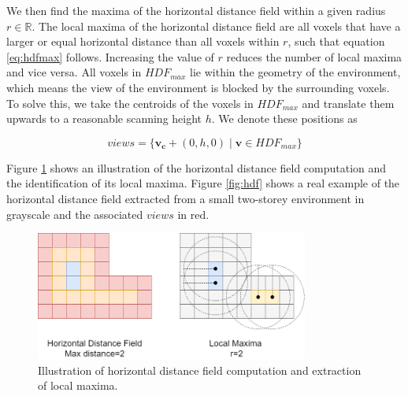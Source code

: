 We then find the maxima of the horizontal distance field within a given radius \(r \in \mathbb{R}\).  The local maxima of the horizontal distance field are all voxels that have a larger or equal horizontal distance than all voxels within \(r\), such that equation \ref{eq:hdfmax} follows. Increasing the value of \(r\) reduces the number of local maxima and vice versa. All voxels in \(HDF_{max}\) lie within the geometry of the environment, which means the view of the environment is blocked by the surrounding voxels. To solve this, we take the centroids of the voxels in \(HDF_{max}\) and translate them upwards to a reasonable scanning height \(h\). We denote these positions as 

\begin{equation}
    \label{eq:views}
views = \{\boldsymbol{v_c} + (0, h, 0) \mid \boldsymbol{v} \in HDF_{max}\}
\end{equation}

Figure \ref{fig:hdf_simple} shows an illustration of the horizontal distance field computation and the identification of its local maxima. Figure \ref{fig:hdf} shows a real example of the horizontal distance field extracted from a small two-storey environment in grayscale and the associated \(views\) in red.

\begin{figure}[h]
    \centering
    \includegraphics*[width=0.8\textwidth]{./fig/hdf_simple.png}
    \caption{Illustration of horizontal distance field computation and extraction of local maxima.}
    \label{fig:hdf_simple}
\end{figure}

